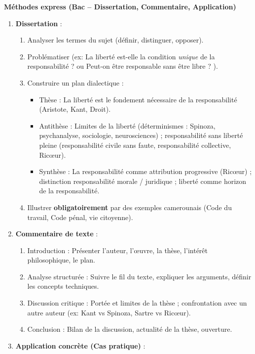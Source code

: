 \documentclass[11pt]{article}
\begin{document}
\begin{aretenir}
\textbf{Méthodes express (Bac -- Dissertation, Commentaire, Application)}
\begin{enumerate}
  \item \textbf{Dissertation} : 
    \begin{enumerate}
      \item Analyser les termes du sujet (définir, distinguer, opposer).
      \item Problématiser (ex: \og La liberté est-elle la condition \emph{unique} de la responsabilité ? \fg{} ou \og Peut-on être responsable sans être libre ? \fg{}).
      \item Construire un plan dialectique : 
        \begin{itemize}
          \item Thèse : La liberté est le fondement nécessaire de la responsabilité (Aristote, Kant, Droit).
          \item Antithèse : Limites de la liberté (déterminismes : Spinoza, psychanalyse, sociologie, neurosciences) ; responsabilité sans liberté pleine (responsabilité civile sans faute, responsabilité collective, Ricœur).
          \item Synthèse : La responsabilité comme attribution progressive (Ricœur) ; distinction responsabilité morale / juridique ; liberté comme horizon de la responsabilité.
        \end{itemize}
      \item Illustrer \textbf{obligatoirement} par des exemples camerounais (Code du travail, Code pénal, vie citoyenne).
    \end{enumerate}
  \item \textbf{Commentaire de texte} : 
    \begin{enumerate}
      \item Introduction : Présenter l'auteur, l'œuvre, la thèse, l'intérêt philosophique, le plan.
      \item Analyse structurée : Suivre le fil du texte, expliquer les arguments, définir les concepts techniques.
      \item Discussion critique : Portée et limites de la thèse ; confrontation avec un autre auteur (ex: Kant vs Spinoza, Sartre vs Ricœur).
      \item Conclusion : Bilan de la discussion, actualité de la thèse, ouverture.
    \end{enumerate}
  \item \textbf{Application concrète (Cas pratique)} : 
    \begin{enumerate}

\end{enumerate}
\end{enumerate}
\end{aretenir}
\end{document}
